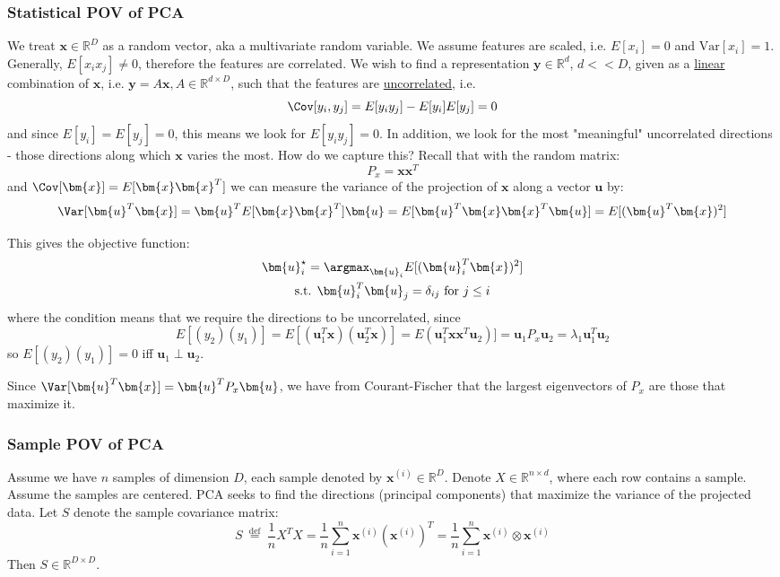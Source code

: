 \documentclass{article}
\begin{document}
\subsubsection{Statistical POV of PCA}
We treat $\bm{x} \in \mathbb{R}^{D}$ as a random vector, aka a multivariate random variable. We assume features are scaled, i.e. $E[x_i]=0$ and $\text{Var}[x_i]=1$.  Generally, $E[x_i x_j] \neq 0$, therefore the features are correlated. We wish to find a representation $\bm{y} \in \mathbb{R}^{d}$, $d <<D$, given as a \ul{linear} combination of $\bm{x}$, i.e. $\bm{y}=A \bm{x}, A \in \mathbb{R}^{d \times D}$, such that the features are \ul{uncorrelated}, i.e.
\[
  \Cov[y_i,y_j]= E[y_i y_j] - E[y_i] E[y_j] =  0
\]
and since $E[y_i]=E[y_j]=0$, this means we look for $E[y_i y_j]=0$. In addition, we look for the most "meaningful" uncorrelated directions - those directions along which $\bm{x}$ varies the most. How do we capture this? Recall that with the random matrix:
\[
  P_{x} = \bm{x} \bm{x}^{T}
\]
and $\Cov[\bm{x}] = E[\bm{x} \bm{x}^{T}]$
we can measure the variance of the projection of $\bm{x}$ along a vector $\bm{u}$ by:
\[
  \Var[\bm{u} ^{T} \bm{x}] = \bm{u}^{T} E[\bm{x} \bm{x}^{T}] \bm{u} = E[\bm{u}^{T} \bm{x} \bm{x} ^{T} \bm{u}] = E[(\bm{u}^{T} \bm{x}) ^2]
\]

This gives the objective function:
\begin{gather*}
  \bm{u}_{i} ^{\star} = \argmax_{\bm{u}_i} E[(\bm{u}_i ^{T} \bm{x})^2]   \\
  \text{s.t. } \bm{u}_i ^{T} \bm{u}_{j} = \delta_{ij} \text{ for } j \leq i
\end{gather*}
where the condition means that we require the directions to be uncorrelated, 
since
\[
  E[(y_2)(y_1)]  = E[(\bm{u}_1 ^{T} \bm{x})(\bm{u}_2^{T} \bm{x})] = E(\bm{u}_1^{T} \bm{x} \bm{x} ^{T} \bm{u}_2)] = \bm{u}_1 P_{x} \bm{u}_2 = \lambda_1 \bm{u}_1 ^{T} \bm{u}_2
\]
so $E[(y_2)(y_1)]= 0$ iff $\bm{u}_1 \perp \bm{u}_2$. 

Since $\Var[\bm{u}^{T} \bm{x}] = \bm{u}^{T} P_{x} \bm{u}$, we have from Courant-Fischer that the largest eigenvectors of $P_{x}$ are those that maximize it. 


\subsubsection{Sample POV of PCA}

Assume we have $n$ samples of dimension $D$, each sample denoted by $\bm{x}^{(i)} \in \mathbb{R}^{D}$. 
Denote $X \in \mathbb{R}^{n \times d}$, where each row contains a sample. Assume the samples are centered. 
PCA seeks to find the directions (principal components) that maximize the variance of the projected data.
Let $S$ denote the sample covariance matrix:
\[
S \stackrel{\text{ def }}{=} \frac{1}{n} X^T X = \frac{1}{n} \sum_{i=1}^{n} \bm{x}^{(i)} (\bm{x}^{(i)})^{T} = \frac{1}{n} \sum_{i=1}^{n} \bm{x}^{(i)} \otimes  \bm{x}^{(i)}
\]
Then $S \in \mathbb{R}^{D \times D}$.
\end{document}
